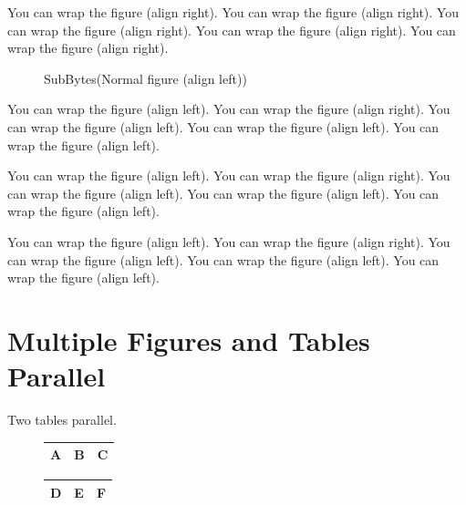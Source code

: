 You can wrap the figure (align right). You can wrap the figure (align 
right). You can wrap the figure (align right). You can wrap the figure
(align right). You can wrap the figure (align right).

\begin{figure}
\caption{SubBytes(Normal figure (align left))} \label{fig:3}
\end{figure}

You can wrap the figure (align left). You can wrap the figure (align 
right). You can wrap the figure (align left). You can wrap the figure
(align left). You can wrap the figure (align left).

You can wrap the figure (align left). You can wrap the figure (align 
right). You can wrap the figure (align left). You can wrap the figure
(align left). You can wrap the figure (align left).

You can wrap the figure (align left). You can wrap the figure (align 
right). You can wrap the figure (align left). You can wrap the figure
(align left). You can wrap the figure (align left).

\section{Multiple Figures and Tables Parallel}
\label{section:1.2}

Two tables parallel.

\begin{figure}[htb]
  \centering
  \begin{minipage}[b]{0.45\textwidth}\center
  \begin{tabular}{|c|c|c|}\hline
   A & B & C\\\hline
  \end{tabular}
  \label{tbl:1}
  \end{minipage}\hspace{0.05\textwidth}
  \begin{minipage}[b]{0.45\textwidth}\center
  \begin{tabular}{|c|c|c|}\hline
  D & E & F\\\hline
  \end{tabular}
  \label{tbl:2}
  \end{minipage}
\end{figure}

